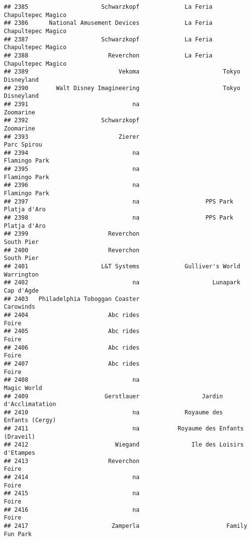 \documentclass[
]{article}
\begin{document}
\begin{verbatim}
## 2385                     Schwarzkopf             La Feria Chapultepec Magico
## 2386      National Amusement Devices             La Feria Chapultepec Magico
## 2387                     Schwarzkopf             La Feria Chapultepec Magico
## 2388                       Reverchon             La Feria Chapultepec Magico
## 2389                          Vekoma                        Tokyo Disneyland
## 2390        Walt Disney Imagineering                        Tokyo Disneyland
## 2391                              na                               Zoomarine
## 2392                     Schwarzkopf                               Zoomarine
## 2393                          Zierer                             Parc Spirou
## 2394                              na                           Flamingo Park
## 2395                              na                           Flamingo Park
## 2396                              na                           Flamingo Park
## 2397                              na                   PPS Park Platja d'Aro
## 2398                              na                   PPS Park Platja d'Aro
## 2399                       Reverchon                              South Pier
## 2400                       Reverchon                              South Pier
## 2401                     L&T Systems             Gulliver's World Warrington
## 2402                              na                     Lunapark Cap d'Agde
## 2403   Philadelphia Toboggan Coaster                               Carowinds
## 2404                       Abc rides                                   Foire
## 2405                       Abc rides                                   Foire
## 2406                       Abc rides                                   Foire
## 2407                       Abc rides                                   Foire
## 2408                              na                             Magic World
## 2409                      Gerstlauer                  Jardin d'Acclimatation
## 2410                              na             Royaume des Enfants (Cergy)
## 2411                              na           Royaume des Enfants (Draveil)
## 2412                         Wiegand               Ile des Loisirs d'Etampes
## 2413                       Reverchon                                   Foire
## 2414                              na                                   Foire
## 2415                              na                                   Foire
## 2416                              na                                   Foire
## 2417                        Zamperla                         Family Fun Park

\end{verbatim}
\end{document}
